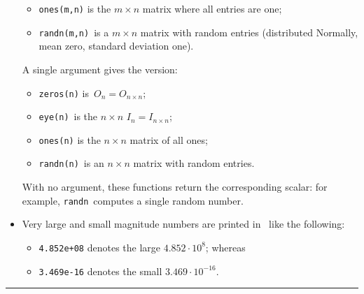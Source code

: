 \begin{table}
\begin{minipage}{\linewidth}
\begin{itemize}
\begin{itemize}
\item {}\verb|ones(m,n)| is the \(m\times n\) matrix where all entries are one;
\item {}\verb|randn(m,n)|~is a \(m\times n\) matrix with random entries (distributed Normally, mean zero, standard deviation one).
\end{itemize}
A single argument gives the  version: 
\begin{itemize}
\item {}\verb|zeros(n)| is~\(O_n=O_{n\times n}\); 
\item \verb|eye(n)|~is the \(n\times n\)  \(I_n=I_{n\times n}\);  
\item \verb|ones(n)| is the \(n\times n\) matrix of all ones;
\item {}\verb|randn(n)|~is an \(n\times n\) matrix with random entries.
\end{itemize}
With no argument, these functions return the corresponding scalar: for example, \verb|randn|~computes a single random number.
\item Very large and small magnitude numbers are printed in \script\ like the following: 
\begin{itemize}
\item \verb|4.852e+08| denotes the large \(4.852\cdot10^8\); whereas 
\item \verb|3.469e-16| denotes the small \(3.469\cdot10^{-16}\).
\end{itemize}
\end{itemize}
\end{minipage}
\hrule
\end{table}

